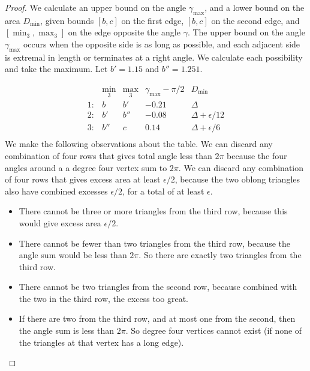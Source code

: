 \begin{proof}  We calculate an upper bound on the angle $\gamma_{\max}$, and a
lower bound on the area $D_{\min}$, given bounds $[b,c]$ on the
first edge, $[b,c]$ on the second edge, and $[\min_3,\max_3]$ on
the edge opposite the angle $\gamma$.  The upper bound on the
angle $\gamma_{\max}$ occurs when the opposite side is as long as
possible, and each adjacent side is extremal in length or
terminates at a right angle.  We calculate each possibility and
take the maximum.  Let $b'=1.15$ and $b''=1.251$.

$$
    \begin{array}{llllll}
      &\min_3&\max_3   &\gamma_{\max} - \pi/2&   D_{\min}\\
    1:&b     &b'       &-0.21              &\Delta\\
    2:&b'    &b''      &-0.08              &\Delta + \epsilon/12\\
    3:&b''   &c        &0.14               &\Delta + \epsilon/6\\
    \end{array}
$$
We make the following observations about the table.  We can
discard any combination of four rows that gives total angle less
than $2\pi$  because the four angles around a a degree four vertex
sum to $2\pi$.  We can discard any combination of four rows that
gives excess area at least $\epsilon/2$, because the two oblong
triangles also have combined excesses $\epsilon/2$, for a total of
at least $\epsilon$.
\begin{itemize}
    \item There cannot be three or more triangles from the third row,
    because this would give excess area $\epsilon/2$.
    \item  There cannot be fewer than two triangles from the third
    row, because the angle sum would be less than $2\pi$. So there
    are exactly two triangles from the third row.
    \item There cannot be two triangles from the second row,
    because combined with the two in the third row, the
    excess too great.
    \item If there are two from the third row, and at most one
    from the second, then the angle sum is less than $2\pi$.  So
    degree four vertices cannot exist (if none of the triangles at
    that vertex has a long edge).
\end{itemize}
\end{proof}


